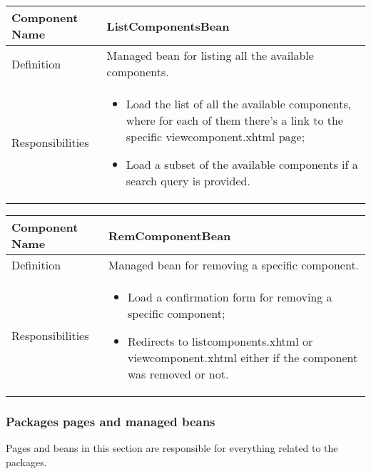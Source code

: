 \documentclass[a4paper,12pt]{book}
\begin{document}
    \begin{center}
      \begin{tabular}{ | p{3.3cm} | p{11.7cm} | }
        \hline
        Component Name & \textbf{ListComponentsBean} \\ \hline
        Definition & Managed bean for listing all the available components. \\ \hline
        Responsibilities & \parbox{0.65\textwidth}{
          \begin{itemize}[noitemsep,leftmargin=*]
            \item Load the list of all the available components, where for each of them there's a link to the specific viewcomponent.xhtml page;
            \item Load a subset of the available components if a search query is provided.
          \end{itemize}} \\ \hline
        \end{tabular}
      \end{center}
      \begin{center}
        \begin{tabular}{ | p{3.3cm} | p{11.7cm} | }
          \hline
          Component Name & \textbf{RemComponentBean} \\ \hline
          Definition & Managed bean for removing a specific component. \\ \hline
          Responsibilities & \parbox{0.65\textwidth}{
            \begin{itemize}[noitemsep,leftmargin=*]
              \item Load a confirmation form for removing a specific component;
              \item Redirects to listcomponents.xhtml or viewcomponent.xhtml either if the component was removed or not.
            \end{itemize}} \\ \hline
          \end{tabular}
        \end{center}

\subsubsection{Packages pages and managed beans}
Pages and beans in this section are responsible for everything related to the packages.
\end{document}

